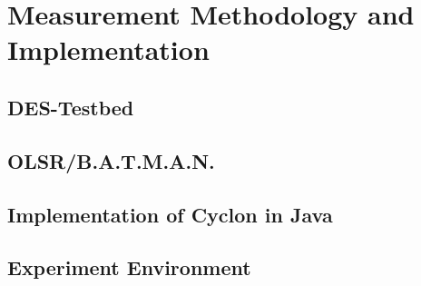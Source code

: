 \chapter{Measurement Methodology and Implementation} 
\label{chap:methodology}

\section{DES-Testbed} %

\section{OLSR/B.A.T.M.A.N.} %

\section{Implementation of Cyclon in Java} %

\section{Experiment Environment}